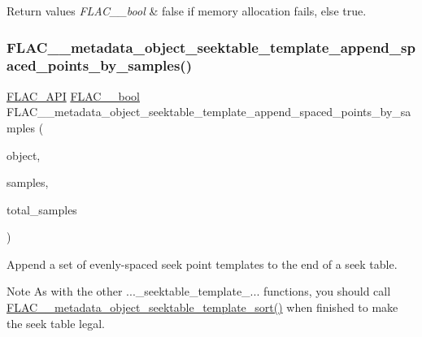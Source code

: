 \begin{DoxyRetVals}{Return values}
{\em F\+L\+A\+C\+\_\+\+\_\+bool} & {\ttfamily false} if memory allocation fails, else {\ttfamily true}. \\
\hline
\end{DoxyRetVals}
\mbox{\label{group__flac__metadata__object_gabf797b64b96808cabf1d995573680fe9}} 
\subsubsection{\texorpdfstring{FLAC\_\_metadata\_object\_seektable\_template\_append\_spaced\_points\_by\_samples()}{FLAC\_\_metadata\_object\_seektable\_template\_append\_spaced\_points\_by\_samples()}}
{\footnotesize\ttfamily \mbox{\hyperlink{group__flac__export_ga56ca07df8a23310707732b1c0007d6f5}{F\+L\+A\+C\+\_\+\+A\+PI}} \mbox{\hyperlink{ordinals_8h_a95103469f1cbd78b8cf250194985b34e}{F\+L\+A\+C\+\_\+\+\_\+bool}} F\+L\+A\+C\+\_\+\+\_\+metadata\+\_\+object\+\_\+seektable\+\_\+template\+\_\+append\+\_\+spaced\+\_\+points\+\_\+by\+\_\+samples (\begin{DoxyParamCaption}\item[{\mbox{\hyperlink{struct_f_l_a_c_____stream_metadata}{F\+L\+A\+C\+\_\+\+\_\+\+Stream\+Metadata}} $\ast$}]{object,  }\item[{unsigned}]{samples,  }\item[{\mbox{\hyperlink{ordinals_8h_aa78c8c70a3eb8a58af7436f278acde8e}{F\+L\+A\+C\+\_\+\+\_\+uint64}}}]{total\+\_\+samples }\end{DoxyParamCaption})}

Append a set of evenly-\/spaced seek point templates to the end of a seek table.

\begin{DoxyNote}{Note}
As with the other ...\+\_\+seektable\+\_\+template\+\_\+... functions, you should call \mbox{\hyperlink{group__flac__metadata__object_gaee6a1f08321b56a3fa65af94dd7830cd}{F\+L\+A\+C\+\_\+\+\_\+metadata\+\_\+object\+\_\+seektable\+\_\+template\+\_\+sort()}} when finished to make the seek table legal.
\end{DoxyNote}

